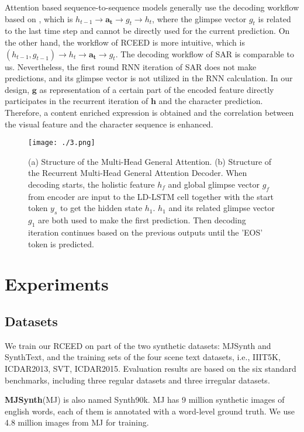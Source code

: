 \documentclass[runningheads]{llncs}
\begin{document}
Attention based sequence-to-sequence models\cite{shi2018aster,litman2020scatter,liao2019mask} generally use the decoding workflow based on \cite{bahdanau2014neural}, which is $h_{t-1}\rightarrow \mathbf{a_{t}} \rightarrow g_{t}\rightarrow h_{t}$, where the glimpse vector $g_{t}$ is related to the last time step and cannot be directly used for the current prediction. On the other hand, the workflow of RCEED is more intuitive, which is $(h_{t-1},g_{t-1})\rightarrow h_{t}\rightarrow \mathbf{a_{t}} \rightarrow g_{t}$. The decoding workflow of SAR\cite{li2019show} is comparable to us. Nevertheless, the first round RNN iteration of SAR does not make predictions, and its glimpse vector is not utilized in the RNN calculation. In our design, $\mathbf{g}$ as representation of a certain part of the encoded feature directly participates in the recurrent iteration of $\mathbf{h}$ and the character prediction. Therefore, a content enriched expression is obtained and the correlation between the visual feature and the character sequence is enhanced. 
\begin{figure}
\vspace{-0.2cm}
\setlength{\belowcaptionskip}{-0.6cm} 
\centering
\texttt{[image: ./3.png]}
\caption{(a) Structure of the Multi-Head General Attention.  (b) Structure of the  Recurrent Multi-Head General Attention Decoder. When decoding starts, the holistic feature $h_{f}$ and global glimpse vector $g_{f}$ from encoder are input to the LD-LSTM cell together with the start token $y_{s}$ to get the hidden state $h_{1}$. $h_{1}$ and its related glimpse vector $g_{1}$ are both used to make the first prediction. Then decoding iteration continues based on the previous outputs until the 'EOS' token is predicted.} 
\label{Fig.4}
\end{figure}
\section{Experiments}
\subsection{Datasets}
We train our RCEED on part of the two synthetic datasets: MJSynth and SynthText, and the training sets of the four scene text datasets, i.e., IIIT5K, ICDAR2013, SVT, ICDAR2015. Evaluation results are based on the six standard benchmarks, including three regular datasets and three irregular datasets.

\textbf{MJSynth}(MJ)\cite{jaderberg2014synthetic} is also named Synth90k. MJ has 9 million synthetic images of english words, each of them is annotated with a word-level ground truth. We use 4.8 million images from MJ for training.
\end{document}
